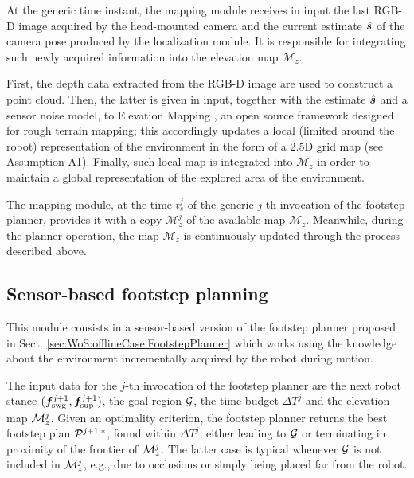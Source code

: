 At the generic time instant, the mapping module receives in input the last RGB-D image acquired by the head-mounted camera and the current estimate $\hat{{\bm{s}}}$ of the camera pose produced by the localization module. 
It is responsible for integrating such newly acquired information into the elevation map
$\mathcal{M}_z$.

First, the depth data extracted from the RGB-D image are used to construct a point cloud.
Then, the latter is given in input, together with the estimate $\hat{{\bm{s}}}$ and a sensor noise model, to Elevation Mapping \cite{FaBlHu:18}, an open source framework designed for rough terrain mapping; this accordingly updates a local (limited around the robot)
representation of the environment in the form of a 2.5D grid map (see Assumption A1).
Finally, such local map is integrated into $\mathcal{M}_z$ in order to maintain a global representation of the explored area of the environment.

The mapping module, at the time $t_s^j$ of the generic $j$-th invocation of the footstep planner, provides it with a copy $\mathcal{M}_z^j$ of the available map $\mathcal{M}_z$.
Meanwhile, during the planner operation, the map $\mathcal{M}_z$ is continuously updated through the process described above.

\subsection{Sensor-based footstep planning}
\label{sec:WoS:onlineCase:FootstepPlanner}

This module consists in a sensor-based version of the footstep planner proposed in Sect. \ref{sec:WoS:offlineCase:FootstepPlanner} which works using the knowledge about the environment incrementally acquired by the robot during motion. 

The input data for the $j$-th invocation of the footstep planner are the next robot stance $({\bm{f}}_{\rm swg}^{j+1}, {\bm{f}}_{\rm sup}^{j+1})$, the goal region $\cal G$, the time budget ${\Delta T}^j$ and the elevation map ${\cal M}_z^j$. 
Given an optimality criterion, the footstep planner returns the best footstep plan ${\cal P}^{j+1,*}$, found within ${\Delta T}^j$, either leading to $\cal G$ or terminating in proximity of the frontier of ${\cal M}_z^j$.
The latter case is typical whenever $\cal G$ is not included in ${\cal M}_z^j$, e.g., due to occlusions or simply being placed far from the robot.

